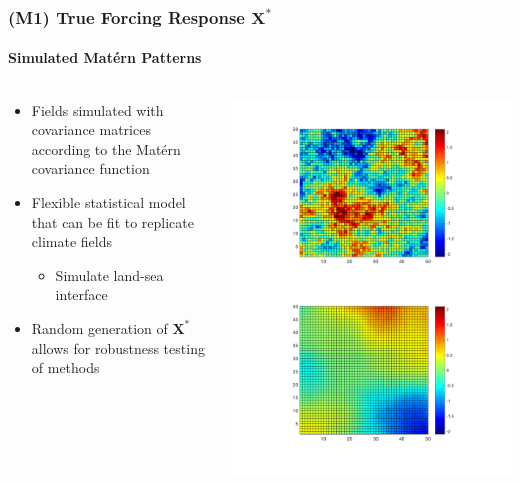 \documentclass{beamer}
\def\*#1{\bm{#1}}
\begin{document}

\begin{frame}
\frametitle{(M1) True Forcing Response $\*X^*$}
\framesubtitle{Simulated Mat\'ern Patterns}

\begin{columns}
\begin{column}{0.5\textwidth}
\begin{itemize}
  \item Fields simulated with covariance matrices according to the Mat\'ern covariance function
  \item Flexible statistical model that can be fit to replicate climate fields
  \begin{itemize}
  \item Simulate land-sea interface
  \end{itemize}
  \item Random generation of $\*X^*$ allows for robustness testing of methods
\end{itemize}
\end{column}
\begin{column}{0.5\textwidth}
    \begin{center}
     \includegraphics[width=\textwidth]{Images/maternExample.png} %
     \end{center}
\end{column}
\end{columns}

\end{frame}
\end{document}
